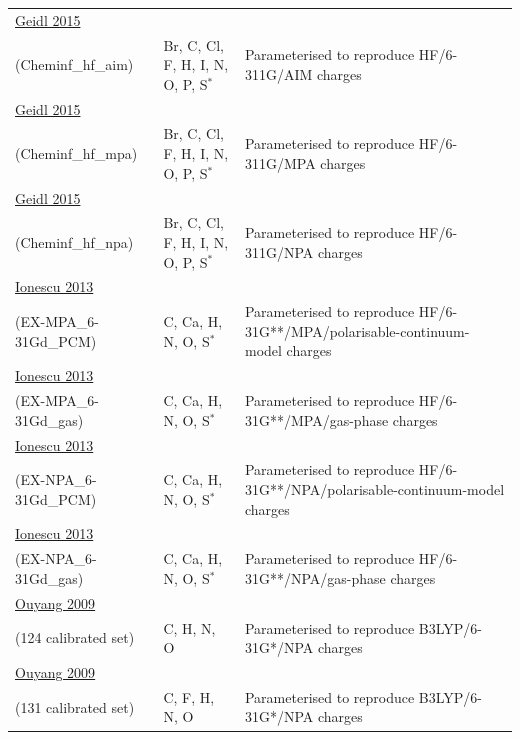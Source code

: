 \documentclass[oneside]{memoir}
\begin{document}
\begin{longtable}{p{4cm} p{3.3cm} p{8cm}}
\addlinespace[5pt]\midrule\addlinespace[5pt] \href{https://doi.org/10.1186/s13321-015-0107-1}{Geidl 2015}\\(Cheminf\_hf\_aim) & Br, C, Cl, F, H, I, N, O, P, S$^{*}$ & Parameterised to reproduce HF/6-311G/AIM charges \\
\addlinespace[5pt]\midrule\addlinespace[5pt] \href{https://doi.org/10.1186/s13321-015-0107-1}{Geidl 2015}\\(Cheminf\_hf\_mpa) & Br, C, Cl, F, H, I, N, O, P, S$^{*}$ & Parameterised to reproduce HF/6-311G/MPA charges \\
\addlinespace[5pt]\midrule\addlinespace[5pt] \href{https://doi.org/10.1186/s13321-015-0107-1}{Geidl 2015}\\(Cheminf\_hf\_npa) & Br, C, Cl, F, H, I, N, O, P, S$^{*}$ & Parameterised to reproduce HF/6-311G/NPA charges \\
\addlinespace[5pt]\midrule\addlinespace[5pt] \href{https://doi.org/10.1021/ci400448n}{Ionescu 2013}\\(EX-MPA\_6-31Gd\_PCM) & C, Ca, H, N, O, S$^{*}$ & Parameterised to reproduce HF/6-31G**/MPA/polarisable-continuum-model charges \\
\addlinespace[5pt]\midrule\addlinespace[5pt] \href{https://doi.org/10.1021/ci400448n}{Ionescu 2013}\\(EX-MPA\_6-31Gd\_gas) & C, Ca, H, N, O, S$^{*}$ & Parameterised to reproduce HF/6-31G**/MPA/gas-phase charges \\
\addlinespace[5pt]\midrule\addlinespace[5pt] \href{https://doi.org/10.1021/ci400448n}{Ionescu 2013}\\(EX-NPA\_6-31Gd\_PCM) & C, Ca, H, N, O, S$^{*}$ & Parameterised to reproduce HF/6-31G**/NPA/polarisable-continuum-model charges \\
\addlinespace[5pt]\midrule\addlinespace[5pt] \href{https://doi.org/10.1021/ci400448n}{Ionescu 2013}\\(EX-NPA\_6-31Gd\_gas) & C, Ca, H, N, O, S$^{*}$ & Parameterised to reproduce HF/6-31G**/NPA/gas-phase charges \\
\addlinespace[5pt]\midrule\addlinespace[5pt] \href{https://doi.org/10.1039/b821696g}{Ouyang 2009}\\(124 calibrated set) & C, H, N, O & Parameterised to reproduce B3LYP/6-31G*/NPA charges \\
\pagebreak
\href{https://doi.org/10.1039/b821696g}{Ouyang 2009}\\(131 calibrated set) & C, F, H, N, O & Parameterised to reproduce B3LYP/6-31G*/NPA charges \\

\end{longtable}
\end{document}
